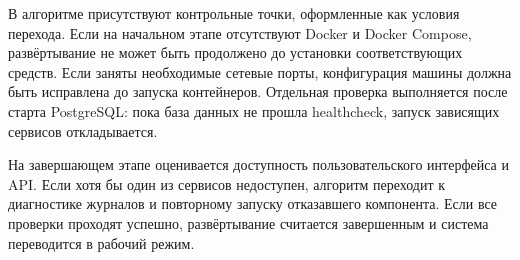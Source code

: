 В алгоритме присутствуют контрольные точки, оформленные как условия перехода. Если на начальном этапе отсутствуют Docker и Docker Compose, развёртывание не может быть продолжено до установки соответствующих средств. Если заняты необходимые сетевые порты, конфигурация машины должна быть исправлена до запуска контейнеров. Отдельная проверка выполняется после старта PostgreSQL: пока база данных не прошла healthcheck, запуск зависящих сервисов откладывается.

На завершающем этапе оценивается доступность пользовательского интерфейса и API. Если хотя бы один из сервисов недоступен, алгоритм переходит к диагностике журналов и повторному запуску отказавшего компонента. Если все проверки проходят успешно, развёртывание считается завершенным и система переводится в рабочий режим.
